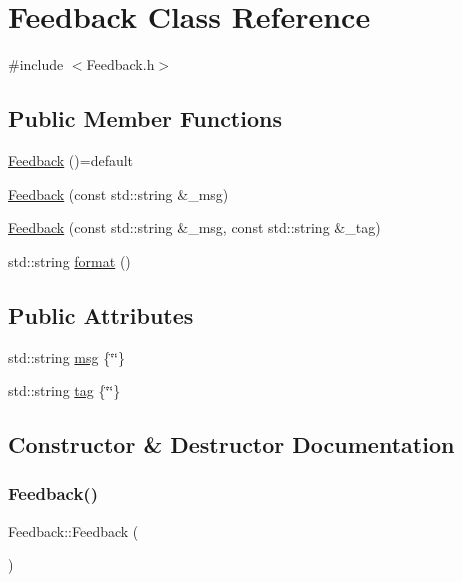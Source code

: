 \hypertarget{class_feedback}{}\section{Feedback Class Reference}
\label{class_feedback}


{\ttfamily \#include $<$Feedback.\+h$>$}

\subsection*{Public Member Functions}
\begin{DoxyCompactItemize}
\item 
\hyperlink{class_feedback_aee536bc54c6afd34e51aa7be39ee5197}{Feedback} ()=default
\item 
\hyperlink{class_feedback_ad479227db3f800f497f287a4f550daa1}{Feedback} (const std\+::string \&\+\_\+msg)
\item 
\hyperlink{class_feedback_a6e2ac37abb3f6679b36a8ad037985c36}{Feedback} (const std\+::string \&\+\_\+msg, const std\+::string \&\+\_\+tag)
\item 
std\+::string \hyperlink{class_feedback_a0b03ebf0611fe0d7e0595c50a64739e7}{format} ()
\end{DoxyCompactItemize}
\subsection*{Public Attributes}
\begin{DoxyCompactItemize}
\item 
std\+::string \hyperlink{class_feedback_a0efc7aed727a0c74948551edfe91c36b}{msg} \{\char`\"{}\char`\"{}\}
\item 
std\+::string \hyperlink{class_feedback_ae28edf8cd337af9d9de4148ce31a8c44}{tag} \{\char`\"{}\char`\"{}\}
\end{DoxyCompactItemize}


\subsection{Constructor \& Destructor Documentation}
\hypertarget{class_feedback_aee536bc54c6afd34e51aa7be39ee5197}{}\label{class_feedback_aee536bc54c6afd34e51aa7be39ee5197} 
\subsubsection{\texorpdfstring{Feedback()}{Feedback()}\hspace{0.1cm}{\footnotesize\ttfamily [1/3]}}
{\footnotesize\ttfamily Feedback\+::\+Feedback (\begin{DoxyParamCaption}{ }\end{DoxyParamCaption})\hspace{0.3cm}{\ttfamily [default]}}

